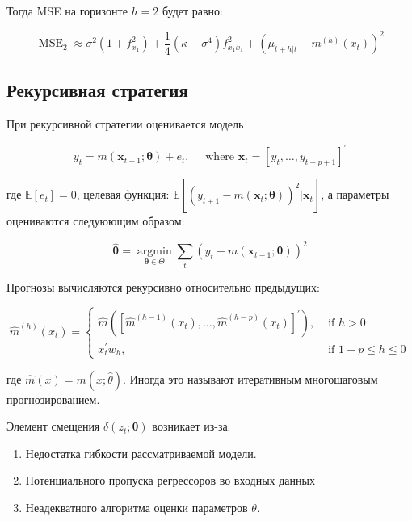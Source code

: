 \documentclass[a4paper,12pt]{article}
\def \mbb{\mathbb}
\def \E{\mbb{E}}
\begin{document}
 Тогда MSE на горизонте $ h = 2$ будет равно:
 
 \[
 \operatorname{MSE}_{2} \approx \sigma^{2}\left(1+f_{x_{1}}^{2}\right)+\frac{1}{4}\left(\kappa-\sigma^{4}\right) f_{x_{1} x_{1}}^{2}+\left(\mu_{t+h | t}-m^{(h)}\left(x_{t}\right)\right)^{2}
 \]
 
\subsection{Рекурсивная стратегия}

При рекурсивной стратегии оценивается модель 

\[
y_{t}=m\left(\boldsymbol{x}_{t-1} ; \boldsymbol{\theta}\right)+e_{t}, \quad \text { where } \boldsymbol{x}_{t}=\left[y_{t}, \ldots, y_{t-p+1}\right]^{\prime}
\]

 где $ \E[e_t] = 0 $, целевая функция: $\mathbb{E}\left[\left(y_{t+1}-m\left(\boldsymbol{x}_{t} ; \boldsymbol{\theta}\right)\right)^{2} | \boldsymbol{x}_{t}\right]$, а параметры оцениваются следуюющим образом:
 
 \[
 \hat{\boldsymbol{\theta}}=\underset{\boldsymbol{\theta} \in \Theta}{\operatorname{argmin}} \sum_{t}\left(y_{t}-m\left(\boldsymbol{x}_{t-1} ; \boldsymbol{\theta}\right)\right)^{2}
 \]
 
 Прогнозы вычисляются рекурсивно относительно предыдущих:
 
 \[
 \hat{m}^{(h)}\left(x_{t}\right)=\left\{\begin{array}{ll}{\hat{m}\left(\left[\hat{m}^{(h-1)}\left(x_{t}\right), \ldots, \hat{m}^{(h-p)}\left(x_{t}\right)\right]^{\prime}\right),} & {\text { if } h>0} \\ {x_{t}^{\prime} w_{h},} & {\text { if } 1-p \leq h \leq 0}\end{array}\right.
 \]
 
 где $ \hat{m}(x) = m(x;\hat{\theta}) $.  Иногда это называют итеративным многошаговым прогнозированием. 
 

 Элемент смещения $\delta\left(z_{t} ; \boldsymbol{\theta}\right)$ возникает из-за:
 
 \begin{enumerate}[\Sun]
 	\item Недостатка гибкости рассматриваемой модели.
 	
 	\item Потенциального пропуска регрессоров во входных данных
 	
 	\item Неадекватного алгоритма оценки параметров $ \theta $.

 \end{enumerate}
\end{document}
